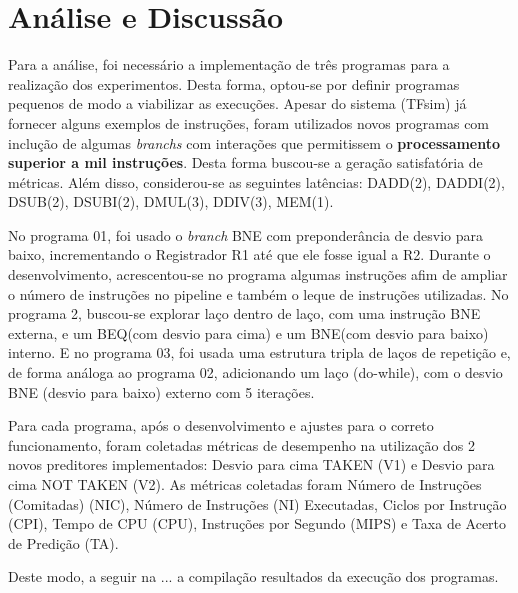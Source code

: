 \documentclass[12pt]{article}
\begin{document}
\section{Análise e Discussão}

Para a análise, foi necessário a implementação de três programas para a realização dos experimentos. Desta forma, optou-se por definir programas pequenos de modo a viabilizar as execuções. Apesar do sistema (TFsim) já fornecer alguns exemplos de instruções, foram utilizados novos programas com inclução de algumas \textit{branchs} com interações que permitissem o \textbf{processamento superior a mil instruções}. Desta forma buscou-se a geração satisfatória de métricas. Além disso, considerou-se as seguintes latências:
DADD(2), DADDI(2), DSUB(2), DSUBI(2), DMUL(3), DDIV(3), MEM(1).

No programa 01, foi usado o \textit{branch} BNE com preponderância de desvio para baixo, incrementando o Registrador R1 até que ele fosse igual a R2. Durante o desenvolvimento, acrescentou-se no programa algumas instruções afim de ampliar o número de instruções no pipeline e também o leque de instruções utilizadas. No programa 2, buscou-se explorar laço dentro de laço, com uma instrução BNE externa, e um BEQ(com desvio para cima) e um BNE(com desvio para baixo) interno. E no programa 03, foi usada uma estrutura tripla de laços de repetição e, de forma análoga ao programa 02, adicionando um laço (do-while), com o desvio BNE (desvio para baixo) externo com 5 iterações.

Para cada programa, após o desenvolvimento e ajustes para o correto funcionamento, foram coletadas métricas de desempenho na utilização dos 2 novos preditores implementados: Desvio para cima TAKEN (V1) e Desvio para cima NOT TAKEN (V2). As métricas coletadas foram Número de Instruções (Comitadas) (NIC), Número de Instruções (NI) Executadas, Ciclos por Instrução (CPI), Tempo de CPU (CPU), Instruções por Segundo (MIPS) e Taxa de Acerto de Predição (TA).

Deste modo, a seguir na ... a compilação resultados da execução dos programas.
\end{document}
